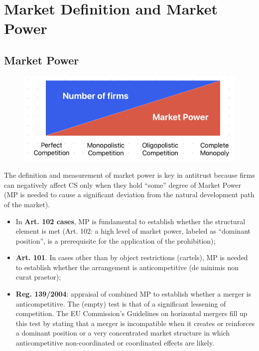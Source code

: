 \setcounter{chapter}{3}
\chapter{Market Definition and Market Power}
\vspace{-1.5cm}

{\chaptoc\noindent\begin{minipage}[inner sep=0,outer sep=0]{0.9\linewidth}\section{Market Power}\end{minipage}}

    \begin{figure}[h]
        \centering
        \includegraphics[width=0.5\linewidth]{graphics/market_power.png}
    \end{figure}

    The definition and measurement of market power is key in antitrust because firms can negatively affect CS only when they hold “some” degree of Market Power (MP is needed to cause a significant deviation from the natural development path of the market).
    \begin{itemize}
        \item In \textbf{Art. 102 cases}, MP is fundamental to establish whether the structural element is met (Art. 102: a high level of market power, labeled as “dominant position”, is a prerequisite for the application of the prohibition);
        \item \textbf{Art. 101}. In cases other than by object restrictions (cartels), MP is needed to establish whether the arrangement is anticompetitive (de minimis non curat praetor);
        \item \textbf{Reg. 139/2004}: appraisal of combined MP to establish whether a merger is anticompetitive. The (empty) test is that of a significant lessening of competition. The EU Commission’s Guidelines on horizontal mergers fill up this test by stating that a merger is incompatible when it creates or reinforces a dominant position or a very concentrated market structure in which anticompetitive non-coordinated or coordinated effects are likely.
    \end{itemize}

